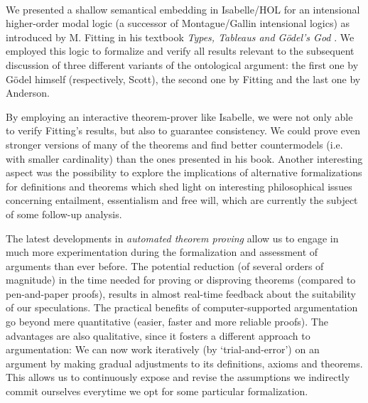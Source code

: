 \begin{isabellebody}
%
\ %
%
\isamarkupfalse%
\ %
%
%
%
%
\isamarkuptrue%
%
\begin{isamarkuptext}%
We presented a shallow semantical embedding in Isabelle/HOL for an intensional higher-order modal logic
(a successor of Montague/Gallin intensional logics) as introduced by M. Fitting in his textbook \emph{Types, Tableaus and 
G\"odel's God} \cite{Fitting}. 
We employed this logic to formalize and verify all results relevant to the subsequent discussion of three different
variants of the ontological argument: the first one by G\"odel himself (respectively, Scott), the second 
one by Fitting and the last one by Anderson.%
\end{isamarkuptext}\isamarkuptrue%
%
\begin{isamarkuptext}%
By employing an interactive theorem-prover like Isabelle, we were not only able to verify Fitting's results,
but also to guarantee consistency. We could prove even stronger versions
of many of the theorems and find better countermodels (i.e. with smaller cardinality) than the ones presented in his book.
Another interesting aspect was the possibility to explore the implications of alternative formalizations
for definitions and theorems which shed light on interesting philosophical issues concerning entailment,
essentialism and free will, which are currently the subject of some follow-up analysis.%
\end{isamarkuptext}\isamarkuptrue%
%
\begin{isamarkuptext}%
The latest developments in \emph{automated theorem proving} allow us to engage in much more experimentation
during the formalization and assessment of arguments than ever before. The potential reduction (of several orders of magnitude)
in the time needed for proving or disproving theorems (compared to pen-and-paper proofs), results in almost real-time
feedback about the suitability of our speculations. The practical benefits of computer-supported argumentation go beyond
mere quantitative (easier, faster and more reliable proofs). The advantages are also qualitative, since it fosters a
different approach to argumentation: We can now work iteratively (by `trial-and-error') on an argument
by making gradual adjustments to its definitions, axioms and theorems. This allows us to continuously expose and revise 
the assumptions we indirectly commit ourselves everytime we opt for some particular formalization.%
\end{isamarkuptext}\isamarkuptrue%
%
%
%
%
%
%
%
\end{isabellebody}%

